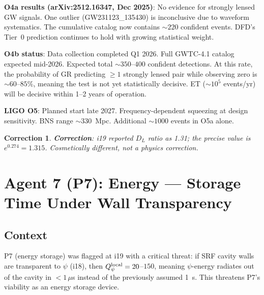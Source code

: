 \documentclass[11pt]{article}
\newcommand{\Qpsi}{Q_\psi}
\newtheorem{correction}[theorem]{Correction}
\theoremstyle{remark}
\begin{document}
\begin{newbox}
\textbf{O4a results (arXiv:2512.16347, Dec 2025)}: No evidence for strongly lensed GW
signals. One outlier (GW231123\_135430) is inconclusive due to waveform systematics.
The cumulative catalog now contains $\sim 220$ confident events. DFD's Tier~0
prediction continues to hold with growing statistical weight.

\textbf{O4b status}: Data collection completed Q1 2026. Full GWTC-4.1 catalog expected
mid-2026. Expected total $\sim 350$--$400$ confident detections. At this rate, the
probability of GR predicting $\geq 1$ strongly lensed pair while observing zero is
$\sim 60$--$85\%$, meaning the test is not yet statistically decisive. ET ($\sim 10^5$
events/yr) will be decisive within 1--2 years of operation.

\textbf{LIGO O5}: Planned start late 2027. Frequency-dependent squeezing at design
sensitivity. BNS range $\sim 330$~Mpc. Additional $\sim 1000$ events in O5a alone.
\end{newbox}

\begin{correction}
\textbf{Correction}: i19 reported $D_L$ ratio as 1.31; the precise value is $e^{0.274}
= 1.315$. Cosmetically different, not a physics correction.
\end{correction}

\newpage
\section{Agent 7 (P7): Energy --- Storage Time Under Wall Transparency}
\label{sec:agent7}

\subsection{Context}
P7 (energy storage) was flagged at i19 with a critical threat: if SRF cavity walls
are transparent to $\psi$ (i18), then $\Qpsi^{\rm local} = 20$--$150$, meaning
$\psi$-energy radiates out of the cavity in $<1\,\mu$s instead of the previously
assumed 1~s. This threatens P7's viability as an energy storage device.
\end{document}
